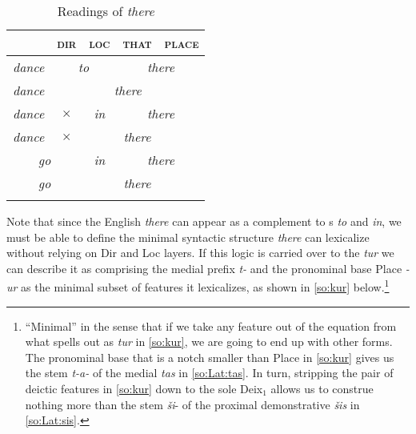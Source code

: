\begin{table}
\caption{Readings of \textit{there}}
\label{table:guido}
\begin{tabular}[t]{ c c c c c }
\lsptoprule	
 \multicolumn{1}{c|}{\textsc{process}}  & \multicolumn{1}{c|}{\textsc{dir}} &\multicolumn{1}{c|}{\textsc{loc}}  & \multicolumn{1}{c|}{\textsc{that}}	& \multicolumn{1}{c}{\textsc{place}}\\\midrule
 \multicolumn{1}{c|}{\textit{dance}}& \multicolumn{2}{c|}{\textit{to}}	&\multicolumn{2}{c}{\textit{there}}\\\hline
 \multicolumn{1}{c|}{\textit{dance}}& \multicolumn{4}{c}{\textit{there}}\\\hline
 \multicolumn{1}{c|}{\textit{dance}}& \multicolumn{1}{c|}{$\times$}	&\multicolumn{1}{c|}{\textit{in}}	&\multicolumn{2}{c}{\textit{there}}\\\hline
\multicolumn{1}{c|}{\textit{dance}}& \multicolumn{1}{c|}{$\times$}	&		  & \textit{there} & \multicolumn{1}{c}{} \\\hline
 \multicolumn{2}{c|}{\textit{go}}	&\multicolumn{1}{c|}{\textit{in}}	&\multicolumn{2}{c}{\textit{there}}\\\hline
 \multicolumn{2}{c|}{\textit{go}}	&		  & \textit{there} & \multicolumn{1}{c}{} \\
 \lspbottomrule
\end{tabular}
\end{table}


\par Note that since the English \textit{there} can appear as a complement to s \textit{to} and \textit{in}, we must be able to define the minimal syntactic structure \textit{there} can lexicalize without relying on Dir and Loc layers. If this logic is carried over to the  \textit{tur} we can describe it as comprising the medial prefix \textit{t-} and the pronominal base Place \textit{-ur} as the minimal subset of features it lexicalizes, as shown in \ref{so:kur} below.\footnote{``Minimal'' in the sense that if we take any feature out of the equation from what spells out as \textit{tur} in \ref{so:kur}, we are going to end up with other forms. The pronominal base that is a notch smaller than Place in \ref{so:kur} gives us the stem \textit{t-a-} of the medial  \textit{tas} in \ref{so:Lat:tas}. In turn, stripping the pair of deictic features in \ref{so:kur} down to the sole Deix$_{1}$ allows us to construe nothing more than the stem \textit{\v{s}i}- of the proximal demonstrative \textit{\v{s}is} in \ref{so:Lat:sis}.
 }%

